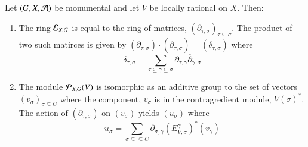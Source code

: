 \setcounter{definition}{1}
\begin{secprop}\label{chap6-proposition-15.2}
Let $(G, X, \mathcal{A})$ be monumental and let $V$ be locally rational on $X$. Then:
\begin{enumerate}[(1)]
\item The ring $\mathcal{E}_{X, G}$ is equal to the ring of matrices, $(\partial_{\tau, \sigma})_{\tau \subseteq \sigma}$. The product of two such matirces is given by $(\partial_{\tau, \sigma}) \cdot (\overline{\partial}_{\tau, \sigma}) = (\delta_{\tau,\sigma})$ where\label{chap6-proposition15.2-enum-1}
$$
\delta_{\tau, \sigma} = \sum\limits_{\tau \subseteq \gamma \subseteq \sigma}\partial_{\tau, \gamma}\overline{\partial}_{\gamma, \sigma}
$$

\item The module $\mathcal{P}_{X, G}(V)$ is isomorphic as an additive group to the set of vectors $(v_{\sigma})_{\sigma \subseteq C}$ where the component, $v_{\sigma}$ is in the contragredient module, $V(\sigma)^{*}$. The action of $(\partial_{\tau, \sigma})$ on $(v_{\sigma})$ yields $(u_{\sigma})$ where\label{chap6-proposition15.2-enum-2}
$$
u_{\sigma} = \sum\limits_{\sigma \subseteq \subseteq C} \partial_{\sigma, \gamma}(E_{V, \sigma}^{\gamma})^{*}(v_{\gamma})
$$
\end{enumerate}
\end{secprop}

